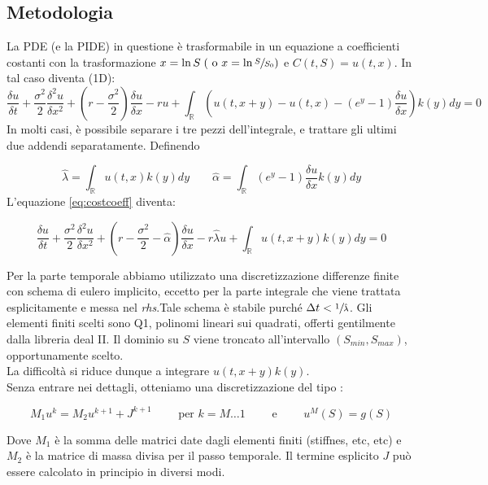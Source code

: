 \documentclass[a4paper,10pt]{article}
\newcommand{\der}[2]{\frac{\delta #1}{\delta #2}}
\newcommand{\dder}[2]{\frac{\delta^2 #1}{\delta #2^2}}
\begin{document}
\subsection{Metodologia}

La PDE (e la PIDE) in questione è trasformabile in un equazione a coefficienti costanti con la trasformazione $x=\ln{S} \; (\text{ o } x=\ln{\sfrac{S}{S_0}})$ e $C(t,S)=u(t,x)$. In tal caso diventa (1D):
{
\small
\begin{equation}
 \der{u}{t}+\frac{\sigma^2}{2}\dder{u}{x}+\left(r-\frac{\sigma^2}{2}\right)\der{u}{x}-ru+\int_\mathbb{R}\left( u(t,x+y)-u(t,x)-(e^y-1)\der{u}{x}\right)k(y)dy=0
\label{eq:costcoeff}
 \end{equation}
\normalsize
}
In molti casi, è possibile separare i tre pezzi dell'integrale, e trattare gli ultimi due addendi separatamente. Definendo 

\begin{equation*}
 \hat{\lambda}=\int_\mathbb{R}u(t,x)k(y)dy \qquad \hat{\alpha}=\int_\mathbb{R}(e^y-1)\der{u}{x}k(y)dy
\end{equation*}
L'equazione \eqref{eq:costcoeff} diventa: 

{

\begin{equation}
 \der{u}{t}+\frac{\sigma^2}{2}\dder{u}{x}+\left(r-\frac{\sigma^2}{2}-\hat{\alpha}\right)\der{u}{x}-r\hat{\lambda}u+\int_\mathbb{R}u(t,x+y)k(y)dy=0
\end{equation}
}

Per la parte temporale abbiamo utilizzato una discretizzazione differenze finite con schema di eulero implicito, eccetto per la parte integrale che viene trattata esplicitamente e messa nel \emph{rhs}.Tale schema è stabile purché $\Delta t < \sfrac{1}{\hat{\lambda}}$. Gli elementi finiti scelti sono Q1, polinomi lineari sui quadrati, offerti gentilmente dalla libreria deal II. Il dominio su $S$ viene troncato all'intervallo $(S_{min},S_{max})$, opportunamente scelto. 
\\
La difficoltà si riduce dunque a integrare $u(t,x+y)k(y)$.
\\
Senza entrare nei dettagli, otteniamo una discretizzazione del tipo :

\begin{equation}
 M_1u^k=M_2u^{k+1}+J^{k+1}  \qquad \text{ per } k=M\dots1 \qquad \text{ e } \qquad u^{M}(S)=g(S) 
\end{equation}

Dove $M_1$ è la somma delle matrici date dagli elementi finiti (stiffnes, etc, etc) e $M_2$ è la matrice di massa divisa per il passo temporale. Il termine esplicito $J$ può essere calcolato in principio in diversi modi.
\end{document}
